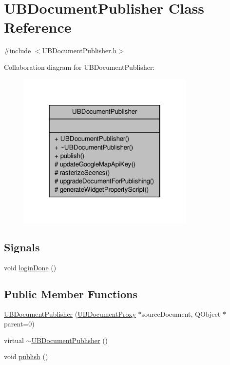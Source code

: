 \hypertarget{class_u_b_document_publisher}{\section{U\-B\-Document\-Publisher Class Reference}
\label{da/d3c/class_u_b_document_publisher}
}


{\ttfamily \#include $<$U\-B\-Document\-Publisher.\-h$>$}



Collaboration diagram for U\-B\-Document\-Publisher\-:
\nopagebreak
\begin{figure}[H]
\begin{center}
\leavevmode
\includegraphics[width=250pt]{d7/dec/class_u_b_document_publisher__coll__graph}
\end{center}
\end{figure}
\subsection*{Signals}
\begin{DoxyCompactItemize}
\item 
void \hyperlink{class_u_b_document_publisher_a0f608b78d4ee305ea64a99913d2040f6}{login\-Done} ()
\end{DoxyCompactItemize}
\subsection*{Public Member Functions}
\begin{DoxyCompactItemize}
\item 
\hyperlink{class_u_b_document_publisher_adc0661b8b18e0663a4d7f9c58dc74baa}{U\-B\-Document\-Publisher} (\hyperlink{class_u_b_document_proxy}{U\-B\-Document\-Proxy} $\ast$source\-Document, Q\-Object $\ast$parent=0)
\item 
virtual \hyperlink{class_u_b_document_publisher_ae4f5d627218f7a9ea845e16180854a8e}{$\sim$\-U\-B\-Document\-Publisher} ()
\item 
void \hyperlink{class_u_b_document_publisher_adca541347ad643ceea47eeb3f48bc24a}{publish} ()
\end{DoxyCompactItemize}
